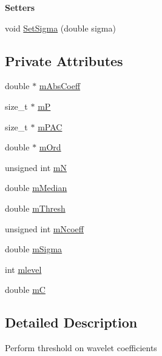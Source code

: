 \begin{Indent}\textbf{ Setters}\par
\begin{DoxyCompactItemize}
\item 
void \hyperlink{classtsa_1_1_wavelet_threshold_a828cc5dbb8c68647a28f72eb0945e2a4}{Set\+Sigma} (double sigma)
\end{DoxyCompactItemize}
\end{Indent}
\subsection*{Private Attributes}
\begin{DoxyCompactItemize}
\item 
double $\ast$ \hyperlink{classtsa_1_1_wavelet_threshold_a033b585f29f5e95f7e525e993569e781}{m\+Abs\+Coeff}
\item 
size\+\_\+t $\ast$ \hyperlink{classtsa_1_1_wavelet_threshold_a937714dbfda90649e89c445837bf7bd3}{mP}
\item 
size\+\_\+t $\ast$ \hyperlink{classtsa_1_1_wavelet_threshold_a8491f1b1b3679c964294a3b277513374}{m\+P\+AC}
\item 
double $\ast$ \hyperlink{classtsa_1_1_wavelet_threshold_a85ce0caeabe9ca87f46e6a87df776262}{m\+Ord}
\item 
unsigned int \hyperlink{classtsa_1_1_wavelet_threshold_a5ee193a15408f941545c28a04cd3f71f}{mN}
\item 
double \hyperlink{classtsa_1_1_wavelet_threshold_a94759bf0bffb9f82c4544ace28d511ff}{m\+Median}
\item 
double \hyperlink{classtsa_1_1_wavelet_threshold_abce83133feca77b08cfc7efdb017e8ca}{m\+Thresh}
\item 
unsigned int \hyperlink{classtsa_1_1_wavelet_threshold_a1cde32dc32105b805047c8f59fa96057}{m\+Ncoeff}
\item 
double \hyperlink{classtsa_1_1_wavelet_threshold_a99b389ace8c9d6578e356b7a1c6855d9}{m\+Sigma}
\item 
int \hyperlink{classtsa_1_1_wavelet_threshold_af3141e33035206b95835c279a39393eb}{mlevel}
\item 
double \hyperlink{classtsa_1_1_wavelet_threshold_afb847894dc69de8339ceb444bc8e1dca}{mC}
\end{DoxyCompactItemize}


\subsection{Detailed Description}
Perform threshold on wavelet coefficients 

